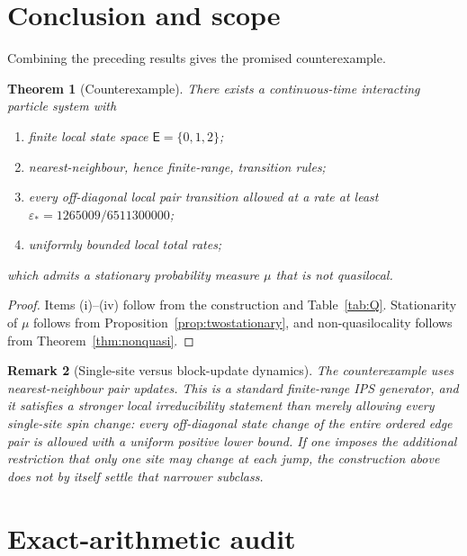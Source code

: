 \documentclass[11pt]{article}
\newtheorem{theorem}{Theorem}
\newtheorem{remark}[theorem]{Remark}
\newcommand{\EE}{\mathsf E}
\begin{document}
\section{Conclusion and scope}

Combining the preceding results gives the promised counterexample.

\begin{theorem}[Counterexample]\label{thm:main}
There exists a continuous-time interacting particle system with
\begin{enumerate}[label=(\roman*)]
\item finite local state space $\EE=\{0,1,2\}$;
\item nearest-neighbour, hence finite-range, transition rules;
\item every off-diagonal local pair transition allowed at a rate at least
$\varepsilon_*=1265009/6511300000$;
\item uniformly bounded local total rates;
\end{enumerate}
which admits a stationary probability measure $\mu$ that is not quasilocal.
\end{theorem}

\begin{proof}
Items (i)--(iv) follow from the construction and Table~\ref{tab:Q}.
Stationarity of $\mu$ follows from Proposition~\ref{prop:twostationary}, and
non-quasilocality follows from Theorem~\ref{thm:nonquasi}.
\end{proof}

\begin{remark}[Single-site versus block-update dynamics]
The counterexample uses nearest-neighbour \emph{pair updates}.  This is a
standard finite-range IPS generator, and it satisfies a stronger local
irreducibility statement than merely allowing every single-site spin change:
every off-diagonal state change of the entire ordered edge pair is allowed with
a uniform positive lower bound.  If one imposes the additional restriction that
\emph{only one site may change at each jump}, the construction above does not
by itself settle that narrower subclass.
\end{remark}

\section*{Exact-arithmetic audit}
\end{document}
